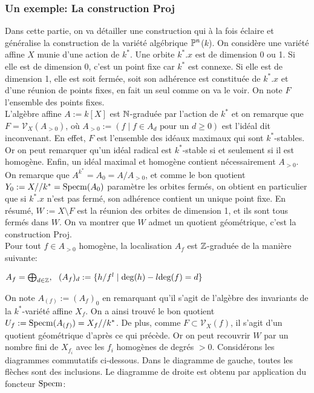 \subsubsection{Un exemple: La construction Proj}
Dans cette partie, on va détailler une construction qui à la fois éclaire et généralise la construction de la variété algébrique $\mathbb{P}^n$($k$). On considère une variété affine $X$ munie d'une action de $k^*$. Une orbite $k^*.x$ est de dimension 0 ou 1. Si elle est de dimension 0, c'est un point fixe car $k^*$ est connexe. Si elle est de dimension 1, elle est soit fermée, soit son adhérence est constituée de $k^*.x$  et d'une réunion de points fixes, en fait un seul comme on va le voir. On note $F$ l'ensemble des points fixes. \\
L'algèbre affine $A:=k[X]$ est $\mathbb{N}$-graduée par l'action de $k^*$ et on remarque que $F=\mathcal{V}_X(A_{>0})$, où $A_{>0}:=(f\mid f\in A_d \textrm{ pour un }d\geq 0)$ est l'idéal dit inconvenant. En effet, $F$ est l'ensemble des idéaux maximaux qui sont $k^*$-stables. Or on peut remarquer qu'un idéal radical est $k^*$-stable si et seulement si il est homogène. Enfin, un idéal maximal et homogène contient nécessairement $A_{>0}$.\\
On remarque que $A^{k^*}=A_0=A/A_{>0}$, et comme le bon quotient $Y_0:=X//k^*=\operatorname{Specm} (A_0)$ paramètre les orbites fermés, on obtient en particulier que si $k^*.x$ n'est pas fermé, son adhérence contient un unique point fixe. En résumé, $W:=X\setminus F$ est la réunion des orbites de dimension 1, et ils sont tous fermés dans $W$. On va montrer que $W$ admet un quotient géométrique, c'est la construction Proj.\\
Pour tout $f\in A_{>0}$ homogène, la localisation $A_f$ est $\mathbb{Z}$-graduée de la manière suivante:
\begin{center}
 $A_f=\bigoplus_{d\in \mathbb{Z}},\,\,\,\, (A_f)_d:=\lbrace h/f^l\mid \textrm{deg}(h)-l\textrm{deg}(f)=d \rbrace$
\end{center}
On note $A_{(f)}:=(A_f)_0$ en remarquant qu'il s'agit de l'algèbre des invariants de la $k^*$-variété affine $X_f$. On a ainsi trouvé le bon quotient $U_f:=\operatorname{Specm}(A_{(f)})=X_f//k^*$. De plus, comme $F\subset\mathcal{V}_X(f)$,  il s'agit d'un quotient géométrique d'après ce qui précède. Or on peut recouvrir $W$ par un nombre fini de $X_{f_i}$ avec les $f_i$ homogènes de degrés $>0$. Considérons les diagrammes commutatifs ci-dessous. Dans le diagramme de gauche, toutes les flèches sont des inclusions. Le diagramme de droite est obtenu par application du foncteur $\operatorname{Specm}$:
